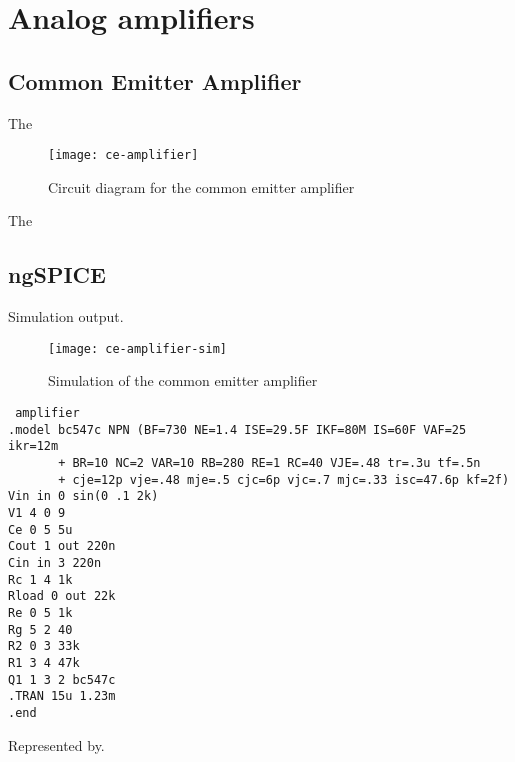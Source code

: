 \chapter{Analog amplifiers}

\section{Common Emitter Amplifier}
The

\begin{figure}[H]
    \centering
    \texttt{[image: ce-amplifier]}\label{ce-amplifier}
    \caption{Circuit diagram for the common emitter amplifier}
\end{figure}

The

\section{ngSPICE}
Simulation output.

\begin{figure}[H]
    \centering
    \texttt{[image: ce-amplifier-sim]}\label{ce-amplifier-sim}
    \caption{Simulation of the common emitter amplifier}
\end{figure}

\begin{lstlisting}
 amplifier
.model bc547c NPN (BF=730 NE=1.4 ISE=29.5F IKF=80M IS=60F VAF=25 ikr=12m
       + BR=10 NC=2 VAR=10 RB=280 RE=1 RC=40 VJE=.48 tr=.3u tf=.5n
       + cje=12p vje=.48 mje=.5 cjc=6p vjc=.7 mjc=.33 isc=47.6p kf=2f)
Vin in 0 sin(0 .1 2k)
V1 4 0 9
Ce 0 5 5u
Cout 1 out 220n
Cin in 3 220n
Rc 1 4 1k
Rload 0 out 22k
Re 0 5 1k
Rg 5 2 40
R2 0 3 33k
R1 3 4 47k
Q1 1 3 2 bc547c
.TRAN 15u 1.23m
.end
\end{lstlisting}

Represented by.
